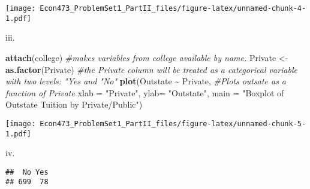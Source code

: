 \documentclass[
]{article}
\newenvironment{Shaded}{\begin{snugshade}}{\end{snugshade}}
\newcommand{\AttributeTok}[1]{\textcolor[rgb]{0.13,0.29,0.53}{#1}}
\newcommand{\CommentTok}[1]{\textcolor[rgb]{0.56,0.35,0.01}{\textit{#1}}}
\newcommand{\DecValTok}[1]{\textcolor[rgb]{0.00,0.00,0.81}{#1}}
\newcommand{\FunctionTok}[1]{\textcolor[rgb]{0.13,0.29,0.53}{\textbf{#1}}}
\newcommand{\NormalTok}[1]{#1}
\newcommand{\OtherTok}[1]{\textcolor[rgb]{0.56,0.35,0.01}{#1}}
\newcommand{\SpecialCharTok}[1]{\textcolor[rgb]{0.81,0.36,0.00}{\textbf{#1}}}
\newcommand{\StringTok}[1]{\textcolor[rgb]{0.31,0.60,0.02}{#1}}
\begin{document}
\texttt{[image: Econ473\_ProblemSet1\_PartII\_files/figure-latex/unnamed-chunk-4-1.pdf]}

iii.

\begin{Shaded}
\begin{Highlighting}[]
\FunctionTok{attach}\NormalTok{(college) }\CommentTok{\#makes variables from college available by name.}
\NormalTok{Private }\OtherTok{\textless{}{-}} \FunctionTok{as.factor}\NormalTok{(Private) }\CommentTok{\#the Private column will be treated as a categorical variable with two levels: "Yes and "No" }
\FunctionTok{plot}\NormalTok{(Outstate }\SpecialCharTok{\textasciitilde{}}\NormalTok{ Private, }\CommentTok{\#Plots outsate as a function of Private}
     \AttributeTok{xlab =} \StringTok{"Private"}\NormalTok{,}
     \AttributeTok{ylab=} \StringTok{"Outstate"}\NormalTok{,}
     \AttributeTok{main =} \StringTok{"Boxplot of Outstate Tuition by Private/Public"}\NormalTok{) }
\end{Highlighting}
\end{Shaded}

\texttt{[image: Econ473\_ProblemSet1\_PartII\_files/figure-latex/unnamed-chunk-5-1.pdf]}

iv.

\begin{Shaded}
\end{Shaded}

\begin{verbatim}
##  No Yes 
## 699  78
\end{verbatim}
\end{document}
